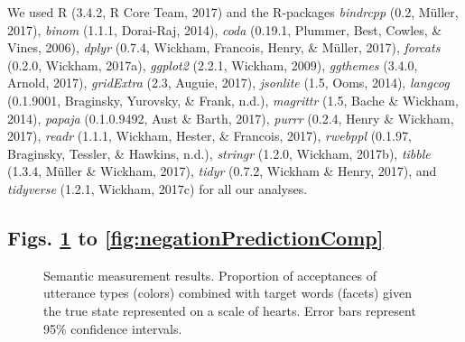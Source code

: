 \documentclass[12pt]{article}
\newcommand{\beginsupplement}{%
        \setcounter{table}{0}
        \renewcommand{\thetable}{S\arabic{table}}%
        \setcounter{figure}{0}
        \renewcommand{\thefigure}{S\arabic{figure}}%
     }
\begin{document}
We used R (3.4.2, R Core Team, 2017) and the R-packages \emph{bindrcpp}
(0.2, Müller, 2017), \emph{binom} (1.1.1, Dorai-Raj, 2014), \emph{coda}
(0.19.1, Plummer, Best, Cowles, \& Vines, 2006), \emph{dplyr} (0.7.4,
Wickham, Francois, Henry, \& Müller, 2017), \emph{forcats} (0.2.0,
Wickham, 2017a), \emph{ggplot2} (2.2.1, Wickham, 2009), \emph{ggthemes}
(3.4.0, Arnold, 2017), \emph{gridExtra} (2.3, Auguie, 2017),
\emph{jsonlite} (1.5, Ooms, 2014), \emph{langcog} (0.1.9001, Braginsky,
Yurovsky, \& Frank, n.d.), \emph{magrittr} (1.5, Bache \& Wickham,
2014), \emph{papaja} (0.1.0.9492, Aust \& Barth, 2017), \emph{purrr}
(0.2.4, Henry \& Wickham, 2017), \emph{readr} (1.1.1, Wickham, Hester,
\& Francois, 2017), \emph{rwebppl} (0.1.97, Braginsky, Tessler, \&
Hawkins, n.d.), \emph{stringr} (1.2.0, Wickham, 2017b), \emph{tibble}
(1.3.4, Müller \& Wickham, 2017), \emph{tidyr} (0.7.2, Wickham \& Henry,
2017), and \emph{tidyverse} (1.2.1, Wickham, 2017c) for all our
analyses.


\subsection*{Figs. \ref{fig:litSem} to \ref{fig:negationPredictionComp}}

\setcounter{figure}{0}    
\beginsupplement

\begin{figure}[h]
\centering
\caption{\label{fig:litSem}Semantic measurement results. Proportion of
acceptances of utterance types (colors) combined with target words
(facets) given the true state represented on a scale of hearts. Error
bars represent 95\% confidence intervals.}
\end{figure}
\end{document}
